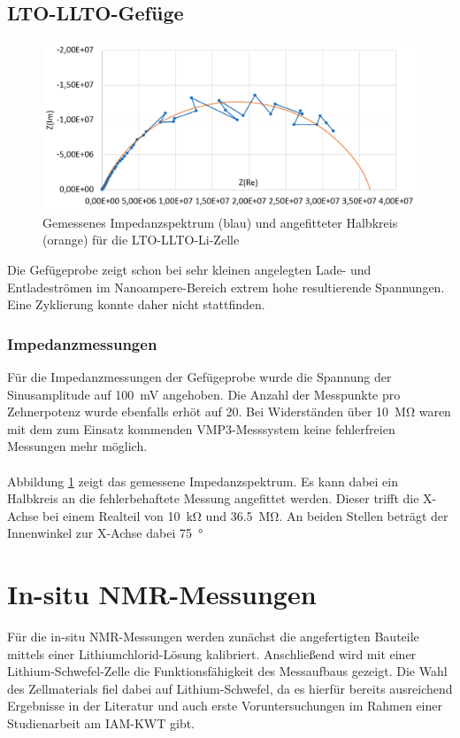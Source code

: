 \documentclass[a4paper, 11pt, headsepline,footsepline,twoside,abstract]{scrbook}
\begin{document}
\subsection{LTO-LLTO-Gefüge}
\begin{figure}
	\centering
	\includegraphics[width=1.00\columnwidth]{images/IS_Gefuege.jpg}
	\caption{Gemessenes Impedanzspektrum (blau) und angefitteter Halbkreis (orange) für die LTO-LLTO-Li-Zelle}
	\label{is_Gefuege}
\end{figure}
Die Gefügeprobe zeigt schon bei sehr kleinen angelegten Lade- und Entladeströmen im Nanoampere-Bereich extrem hohe resultierende Spannungen. Eine Zyklierung konnte daher nicht stattfinden.
\subsubsection{Impedanzmessungen}
Für die Impedanzmessungen der Gefügeprobe wurde die Spannung der Sinusamplitude auf \SI{100}{\milli\volt} angehoben. Die Anzahl der Messpunkte pro Zehnerpotenz wurde ebenfalls erhöt auf 20. Bei Widerständen über \SI{10}{\mega\ohm} waren mit dem zum Einsatz kommenden VMP3-Messsystem keine fehlerfreien Messungen mehr möglich.
\\\\
Abbildung \ref{is_Gefuege} zeigt das gemessene Impedanzspektrum. Es kann dabei ein Halbkreis an die fehlerbehaftete Messung angefittet werden. Dieser trifft die X-Achse bei einem Realteil von \SI{10}{\kilo\ohm} und \SI{36.5}{\mega\ohm}. An beiden Stellen beträgt der Innenwinkel zur X-Achse dabei \SI{75}{\degree}
\newpage
\section{In-situ NMR-Messungen}
Für die in-situ NMR-Messungen werden zunächst die angefertigten Bauteile mittels einer Lithiumchlorid-Lösung kalibriert. Anschließend wird mit einer Lithium-Schwefel-Zelle die Funktionsfähigkeit des Messaufbaus gezeigt. Die Wahl des Zellmaterials fiel dabei auf Lithium-Schwefel, da es hierfür bereits ausreichend Ergebnisse in der Literatur und auch erste Voruntersuchungen im Rahmen einer Studienarbeit am IAM-KWT gibt.
\end{document}
